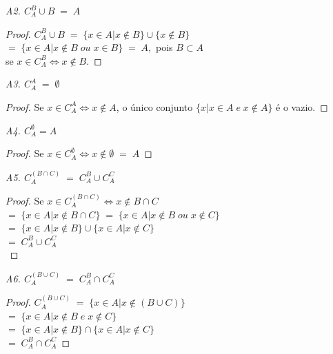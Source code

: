 	\emph{A2. $ C_ A^B \cup B\; = \; A$}
	\begin{proof}
		$ C_A^B \cup B \; = \; \{ x \in A | x \notin B \} \cup \{ x \notin B \} $ \\
		
		$ = \; \{ x \in A | x \notin B \; ou \; x \in B \} \; = \; A, $ pois $ B \subset A $ \\
	
		se $ x \in C_ A^B \Leftrightarrow x \notin B $. 
		
	\end{proof}
	
	\emph{A3. $C_A^A \; = \; \emptyset$} 
	\begin{proof}
		Se $x \in C_A^A \Leftrightarrow x \notin A$, o único conjunto $ \{ x| x \in A \; e \; x \notin A  \} $ é o vazio. 
	\end{proof}
	
	\emph{A4. $ C_A^{\emptyset} = A $}
	\begin{proof}
		Se $ x \in C_ A^\emptyset \Leftrightarrow x \notin \emptyset \; = \; A $
	\end{proof}
	
	
	\emph{A5. $ C_A^{(B \cap C)} \; = \; C_ A^B \cup C_A^C $}
	
	\begin{proof}
		Se $x \in C_A^{(B \cap C )} \Leftrightarrow x \notin B \cap C $\\
		
		$= \; \{ x \in A | x \notin B \cap C \} \; = \; \{ x \in A | x \notin B \; ou \; x \notin C  \} $ \\
		
		$ = \; \{ x \in A | x \notin B \} \cup \{ x \in A | x \notin C \} $ \\
		
		$ = \;C_A^B \cup C_A^C $ \\		
		
	\end{proof}
	
	\emph{A6. $ C_ A^{(B \cup C)} \; = \; C_A^B \cap C_A^C $ }
	\begin{proof}
		$ C_A^{(B \cup C)} \; = \; \{ x \in A | x \notin (B \cup C)  \} $ \\
		
		$ = \; \{ x \in A | x \notin B \; e \; x \notin C \} $ \\
		
		$ = \; \{ x \in A | x \notin B \} \cap \{ x \in A | x \notin C \} $ \\
		
		$ = \; C_A^B \cap C_A^C $
		
	\end{proof}
	
